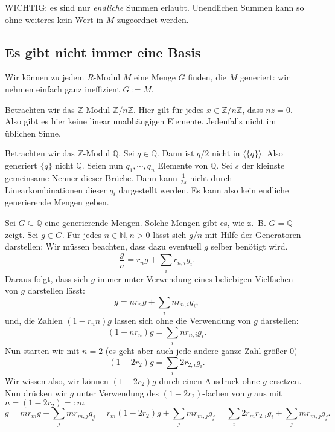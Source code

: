 \documentclass[a4paper]{amsart}
\theoremstyle{definition}
\newcommand{\Q}{\ensuremath{\mathbb{ Q }}}
\newcommand{\Z}{\ensuremath{\mathbb{ Z }}}
\newcommand{\N}{\ensuremath{\mathbb{ N }}}
\newcommand{\zz}[1]{\ensuremath{\Z /#1\Z}}
\newcommand{\zb}{z.~B. }
\begin{document}
WICHTIG: es sind nur \emph{endliche} Summen erlaubt. Unendlichen Summen kann so ohne weiteres kein Wert in $M$ zugeordnet werden.

\subsection{Es gibt nicht immer eine Basis}
Wir können zu jedem $R$-Modul $M$ eine Menge $G$ finden, die $M$ generiert: wir nehmen einfach ganz ineffizient $G := M$.

Betrachten wir das $\Z$-Modul $\zz{n}$. Hier gilt für jedes $x \in \zz{n}$, dass $nz = 0$. Also gibt es hier keine linear unabhängigen Elemente. Jedenfalls nicht im üblichen Sinne.

Betrachten wir das $\Z$-Modul $\Q$. Sei $q \in \Q$. Dann ist $q/2$ nicht in $\langle \{q\}\rangle$. Also generiert $\{q\}$ nicht $\Q$. Seien nun $q_1, \cdots, q_n$ Elemente von $\Q$. Sei $s$ der kleinste gemeinsame Nenner dieser Brüche. Dann kann $\frac{1}{2s}$ nicht durch Linearkombinationen dieser $q_i$ dargestellt werden. Es kann also kein endliche generierende Mengen geben.

Sei $G \subseteq \Q$ eine generierende Mengen. Solche Mengen gibt es, wie \zb $G =\Q$ zeigt. Sei $g \in G$. Für jedes $n \in \N, n>0$ lässt sich $g/n$ mit Hilfe der Generatoren darstellen: Wir müssen beachten, dass dazu eventuell $g$ selber benötigt wird.
\begin{equation}\label{gDurchN}
   \frac{g}{n} = r_ng + \sum_i r_{n,i}g_i. 
\end{equation}
Daraus folgt, dass sich $g$ immer unter Verwendung eines beliebigen Vielfachen von $g$ darstellen lässt:
\begin{equation}\label{gMalN}
   g = nr_ng + \sum_i nr_{n,i}g_i,
\end{equation}
und, die Zahlen $(1-r_nn)g$ lassen sich ohne die Verwendung von $g$ darstellen:
\begin{equation}\label{gMinusRN}
   (1-nr_n)g =  \sum_i nr_{n,i}g_i.
\end{equation}
Nun starten wir mit $n = 2$ (es geht aber auch jede andere ganze Zahl größer $0$)
\begin{equation}\label{g2}
   (1-2r_2)g =  \sum_i 2r_{2,i}g_i.
\end{equation}
Wir wissen also, wir können $(1-2r_2)g$ durch einen Ausdruck ohne $g$ ersetzen. Nun drücken wir $g$ unter Verwendung des $(1-2r_2)$-fachen von $g$ aus mit $n = (1-2r_2) =: m$ 
\begin{equation}\label{g}
   g = mr_mg + \sum_j mr_{m,j}g_j = r_m(1-2r_2)g + \sum_j mr_{m,j}g_j = \sum_i 2r_mr_{2,i}g_i + \sum_j mr_{m,j}g_j.
\end{equation}
\end{document}
